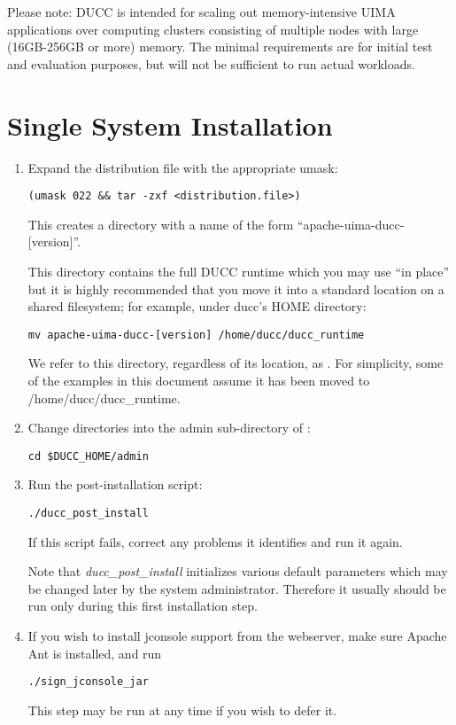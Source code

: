 Please note: DUCC is intended for scaling out memory-intensive UIMA applications over computing
clusters consisting of multiple nodes with large (16GB-256GB or more) memory.  The minimal
requirements are for initial test and evaluation purposes, but will not be sufficient to run actual
workloads.

\section{Single System Installation}
\label{subsec:install.single-user}
    \begin{enumerate}
      \item Expand the distribution file with the appropriate umask:
\begin{verbatim}
(umask 022 && tar -zxf <distribution.file>)
\end{verbatim}

        This creates a directory with a name of the form ``apache-uima-ducc-[version]''.
  
        This directory contains the full DUCC runtime which
        you may use ``in place'' but it is highly recommended that you move it
        into a standard location on a shared filesystem; for example, under ducc's HOME directory:
\begin{verbatim}
mv apache-uima-ducc-[version] /home/ducc/ducc_runtime
\end{verbatim}

        We refer to this directory, regardless of its location, as \duccruntime. For simplicity,
        some of the examples in this document assume it has been moved to /home/ducc/ducc\_runtime.

      \item Change directories into the admin sub-directory of \duccruntime: 
\begin{verbatim}
cd $DUCC_HOME/admin
\end{verbatim}

        \item Run the post-installation script: 
\begin{verbatim}
./ducc_post_install
\end{verbatim}
          If this script fails, correct any problems it identifies and run it again.

          Note that {\em ducc\_post\_install} initializes various default parameters which 
          may be changed later by the system administrator.  Therefore it usually should be
          run only during this first installation step.

        \item If you wish to install jconsole support from the webserver, make sure Apache Ant
          is installed, and run
\begin{verbatim}
./sign_jconsole_jar
\end{verbatim}
          This step may be run at any time if you wish to defer it.

   \end{enumerate}

